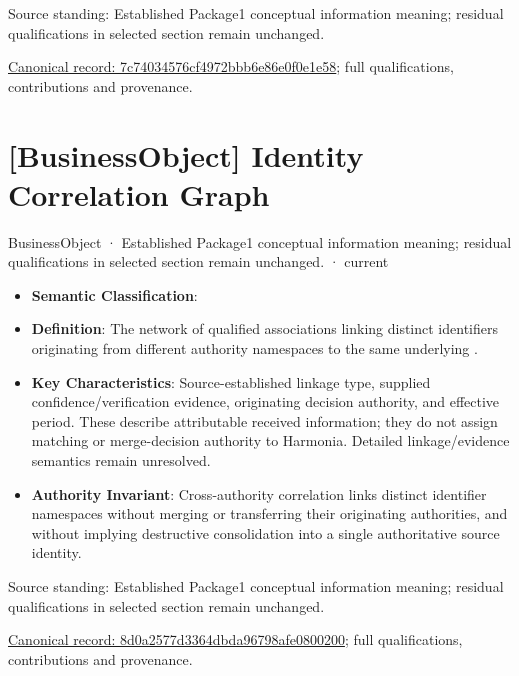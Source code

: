 Source standing: Established Package1 conceptual information meaning; residual qualifications in selected section remain unchanged.


{\footnotesize \href{../../../../continuum/business/business-object/7c74034576cf4972bbb6e86e0f0e1e58.md}{Canonical record: 7c74034576cf4972bbb6e86e0f0e1e58}; full qualifications, contributions and provenance.}\par
\section{[BusinessObject] Identity Correlation Graph}

\label{element:8d0a2577d3364dbda96798afe0800200}
{\small BusinessObject · Established Package1 conceptual information meaning; residual qualifications in selected section remain unchanged. · current}\par

\begin{itemize}


\item \textbf{Semantic Classification}: \texttt{}

\item \textbf{Definition}: The network of qualified associations linking distinct identifiers originating from different authority namespaces to the same underlying \texttt{}.

\item \textbf{Key Characteristics}: Source-established linkage type, supplied confidence/verification evidence, originating decision authority, and effective period. These describe attributable received information; they do not assign matching or merge-decision authority to Harmonia. Detailed linkage/evidence semantics remain unresolved.

\item \textbf{Authority Invariant}: Cross-authority correlation links distinct identifier namespaces without merging or transferring their originating authorities, and without implying destructive consolidation into a single authoritative source identity.

\end{itemize}


Source standing: Established Package1 conceptual information meaning; residual qualifications in selected section remain unchanged.


{\footnotesize \href{../../../../continuum/business/business-object/8d0a2577d3364dbda96798afe0800200.md}{Canonical record: 8d0a2577d3364dbda96798afe0800200}; full qualifications, contributions and provenance.}\par
